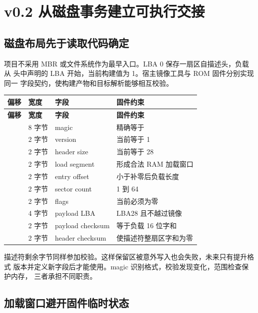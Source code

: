 \section{v0.2 从磁盘事务建立可执行交接}

\subsection{磁盘布局先于读取代码确定}

项目不采用 MBR 或文件系统作为最早入口。LBA 0 保存一扇区自描述头，负载从
头中声明的 LBA 开始，当前构建值为 1。宿主镜像工具与 ROM 固件分别实现同一
字段契约，使构建产物和目标解析能够相互校验。

\begin{longtable}{L{0.12\textwidth}L{0.13\textwidth}L{0.25\textwidth}L{0.38\textwidth}}
\toprule
\textbf{偏移} & \textbf{宽度} & \textbf{字段} & \textbf{固件约束}\\
\midrule
\endfirsthead
\toprule
\textbf{偏移} & \textbf{宽度} & \textbf{字段} & \textbf{固件约束}\\
\midrule
\endhead
{} & 8 字节 & magic & 精确等于 \\
 & 2 字节 & version & 当前等于 1\\
 & 2 字节 & header size & 当前等于 28\\
 & 2 字节 & load segment & 形成合法 RAM 加载窗口\\
 & 2 字节 & entry offset & 小于补零后负载长度\\
 & 2 字节 & sector count & 1 到 64\\
 & 2 字节 & flags & 当前必须为零\\
 & 4 字节 & payload LBA & LBA28 且不越过镜像\\
 & 2 字节 & payload checksum & 等于负载 16 位字和\\
 & 2 字节 & header checksum & 使描述符整扇区字和为零\\
\bottomrule
\end{longtable}

描述符剩余字节同样参加校验。这样保留区被意外写入也会失败，未来只有提升格式
版本并定义新字段后才能使用。magic 识别格式，校验发现变化，范围检查保护内存，
三者承担不同职责。

\subsection{加载窗口避开固件临时状态}

